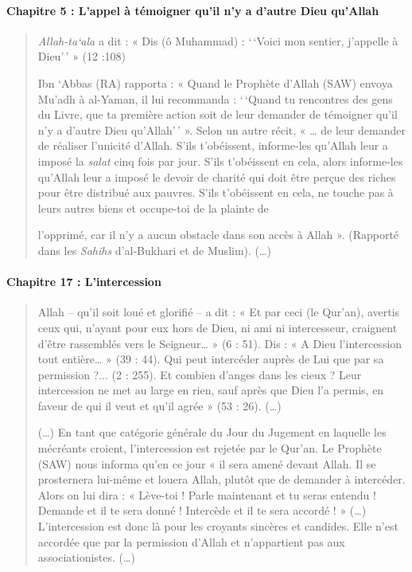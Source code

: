 \paragraph{{Chapitre 5} : L'appel à témoigner qu'il n'y a d'autre
Dieu qu'Allah}
\begin{quote}
\emph{Allah-ta`ala} a dit : « Dis (ô Muhammad) : `\,`Voici mon sentier,
j'appelle à Dieu'\,' » (12 :108)

Ibn `Abbas (RA) rapporta : « Quand le Prophète d'Allah (SAW) envoya
Mu'adh à al-Yaman, il lui recommanda : `\,`Quand tu rencontres des gens
du Livre, que ta première action soit de leur demander de témoigner
qu'il n'y a d'autre Dieu qu'Allah'\,' ». Selon un autre récit, «
\ldots{} de leur demander de réaliser l'unicité d'Allah. S'ils
t'obéissent, informe-les qu'Allah leur a imposé la \emph{salat} cinq
fois par jour. S'ils t'obéissent en cela, alors informe-les qu'Allah
leur a imposé le devoir de charité qui doit être perçue des riches pour
être distribué aux pauvres. S'ils t'obéissent en cela, ne touche pas à
leurs autres biens et occupe-toi de la plainte de

l'opprimé, car il n'y a aucun obstacle dans son accès à Allah ».
(Rapporté dans les \emph{Sahihs} d'al-Bukhari et de Muslim). (\ldots)
\end{quote}
\paragraph{{Chapitre 17} : L'intercession}
\begin{quote}
Allah -- qu'il soit loué et glorifié -- a dit : « Et par ceci (le
Qur'an), avertis ceux qui, n'ayant pour eux hors de Dieu, ni ami ni
intercesseur, craignent d'être rassemblés vers le Seigneur\ldots{} » (6
: 51). Dis : « A Dieu l'intercession tout entière\ldots{} » (39 : 44).
Qui peut intercéder auprès de Lui que par sa permission ?... (2 : 255).
Et combien d'anges dans les cieux ? Leur intercession ne met au large en
rien, sauf après que Dieu l'a permis, en faveur de qui il veut et qu'il
agrée » (53 : 26). (\ldots)

(\ldots) En tant que catégorie générale du Jour du Jugement en laquelle
les mécréants croient, l'intercession est rejetée par le Qur'an. Le
Prophète (SAW) nous informa qu'en ce jour « il sera amené devant Allah.
Il se prosternera lui-même et louera Allah, plutôt que de demander à
intercéder. Alors on lui dira : « Lève-toi ! Parle maintenant et tu
seras entendu ! Demande et il te sera donné ! Intercède et il te sera
accordé ! » (\ldots) L'intercession est donc là pour les croyants
sincères et candides. Elle n'est accordée que par la permission d'Allah
et n'appartient pas aux associationistes. (\ldots)
\end{quote}
